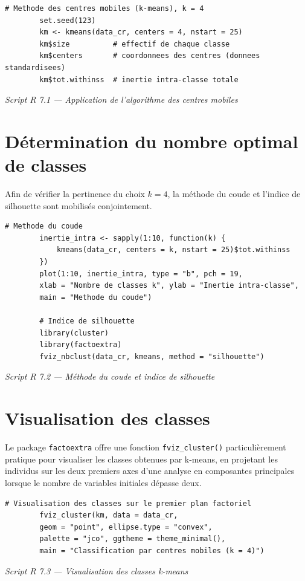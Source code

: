 \documentclass[11pt,a4paper]{report}
\newcommand{\rcaption}[1]{%
	\begin{center}\small\itshape\color{grey} #1\end{center}\vspace{4pt}
}
\begin{document}
	\begin{lstlisting}[style=rstyle]
		# Methode des centres mobiles (k-means), k = 4
		set.seed(123)
		km <- kmeans(data_cr, centers = 4, nstart = 25)
		km$size          # effectif de chaque classe
		km$centers       # coordonnees des centres (donnees standardisees)
		km$tot.withinss  # inertie intra-classe totale
	\end{lstlisting}
	\rcaption{Script R 7.1 --- Application de l'algorithme des centres mobiles}
	
	\section{Détermination du nombre optimal de classes}
	
	Afin de vérifier la pertinence du choix $k = 4$, la méthode du coude et l'indice de silhouette sont mobilisés conjointement.
	
	\begin{lstlisting}[style=rstyle]
		# Methode du coude
		inertie_intra <- sapply(1:10, function(k) {
			kmeans(data_cr, centers = k, nstart = 25)$tot.withinss
		})
		plot(1:10, inertie_intra, type = "b", pch = 19,
		xlab = "Nombre de classes k", ylab = "Inertie intra-classe",
		main = "Methode du coude")
		
		# Indice de silhouette
		library(cluster)
		library(factoextra)
		fviz_nbclust(data_cr, kmeans, method = "silhouette")
	\end{lstlisting}
	\rcaption{Script R 7.2 --- Méthode du coude et indice de silhouette}
	
	\section{Visualisation des classes}
	
	Le package \texttt{factoextra} offre une fonction \texttt{fviz\_cluster()} particulièrement pratique pour visualiser les classes obtenues par k-means, en projetant les individus sur les deux premiers axes d'une analyse en composantes principales lorsque le nombre de variables initiales dépasse deux.
	
	\begin{lstlisting}[style=rstyle]
		# Visualisation des classes sur le premier plan factoriel
		fviz_cluster(km, data = data_cr,
		geom = "point", ellipse.type = "convex",
		palette = "jco", ggtheme = theme_minimal(),
		main = "Classification par centres mobiles (k = 4)")
	\end{lstlisting}
	\rcaption{Script R 7.3 --- Visualisation des classes k-means}
	
\end{document}
